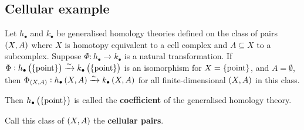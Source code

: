 \subsection{Cellular example}

\begin{proposition}
Let $ h_\bullet $ and $ k_\bullet $ be generalised homology theories defined on the class of pairs $ \br{X, A} $ where $ X $ is homotopy equivalent to a cell complex and $ A \subseteq X $ to a subcomplex. Suppose $ \Phi : h_\bullet \to k_\bullet $ is a natural transformation. If $ \Phi : h_\bullet\br{\pt} \xrightarrow{\sim} k_\bullet\br{\pt} $ is an isomorphism for $ X = \pt $, and $ A = \emptyset $, then $ \Phi_{\br{X, A}} : h_\bullet\br{X, A} \xrightarrow{\sim} k_\bullet\br{X, A} $ for all finite-dimensional $ \br{X, A} $ in this class.
\end{proposition}

Then $ h_\bullet\br{\pt} $ is called the \textbf{coefficient} of the generalised homology theory.

\begin{notation*}
Call this class of $ \br{X, A} $ the \textbf{cellular pairs}.
\end{notation*}

\pagebreak

